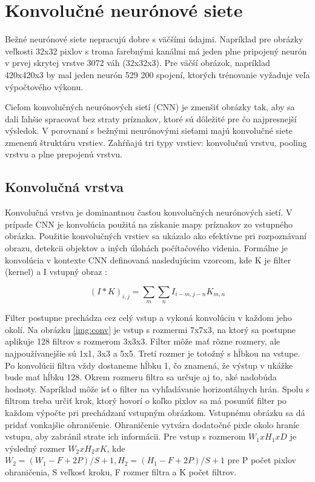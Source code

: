 \section{Konvolučné neurónové siete}

Bežné neurónové siete nepracujú dobre s väčšími údajmi. Napríklad pre obrázky veľkosti 32x32 pixlov s troma farebnými kanálmi má jeden plne pripojený neurón v prvej skrytej vrstve 3072 váh (32x32x3). Pre väčší obrázok, napríklad 420x420x3 by mal jeden neurón 529 200 spojení, ktorých trénovanie vyžaduje veľa výpočtového výkonu.

Cieľom konvolučných neurónových sietí (CNN) je zmenšiť obrázky tak, aby sa dali ľahšie spracovať bez straty príznakov, ktoré sú dôležité pre čo najpresnejší výsledok. V porovnaní s bežnými neurónovými sieťami majú konvolučné siete zmenenú štruktúru vrstiev. Zahŕňajú tri typy vrstiev: konvolučnú vrstvu, pooling vrstvu a plne prepojenú vrstvu.

\subsection{Konvolučná vrstva}

Konvolučná vrstva je dominantnou časťou konvolučných neurónových sietí. V prípade CNN je konvolúcia použitá na získanie mapy príznakov zo vstupného obrázka. Použitie konvolučných vrstiev sa ukázalo ako efektívne pri rozpoznávaní obrazu, detekcii objektov a iných úlohách počítačového videnia. Formálne je konvolúcia v kontexte CNN definovaná nasledujúcim vzorcom, kde K je filter (kernel) a I vstupný obraz \cite{cnn-intro}:

\begingroup
\large
\begin{equation}
(I*K)_{i,j} = \sum_{m} \sum_{n} I_{i-m, j-n} K_{m,n}
\end{equation}
\endgroup

Filter postupne prechádza cez celý vstup a vykoná konvolúciu v každom jeho okolí. Na obrázku \ref{img:conv} je vstup s rozmermi 7x7x3, na ktorý sa postupne aplikuje 128 filtrov s rozmerom 3x3x3. Filter môže mať rôzne rozmery, ale najpoužívanejšie sú 1x1, 3x3 a 5x5. Tretí rozmer je totožný s hĺbkou na vstupe. Po konvolúcii filtra vždy dostaneme hĺbku 1, čo znamená, že výstup v ukážke bude mať hĺbku 128. Okrem rozmeru filtra sa určuje aj to, aké nadobúda hodnoty. Napríklad môže isť o filter na vyhľadávanie horizontálnych hrán. Spolu s filtrom treba určiť krok, ktorý hovorí o koľko pixlov sa má posunúť filter po každom výpočte pri prechádzaní vstupným obrázkom. Vstupnému obrázku sa dá pridať vonkajšie ohraničenie. Ohraničenie vytvára dodatočné pixle okolo hraníc vstupu, aby zabránil strate ich informácii. Pre vstup s rozmerom \begin{math}W_1xH_1xD\end{math} je výsledný rozmer \begin{math}W_2xH_2xK\end{math}, kde \begin{math}W_2 = (W_1 - F + 2P)/S + 1, H_2 = (H_1 - F + 2P)/S + 1\end{math} pre P počet pixlov ohraničenia, S veľkosť kroku, F rozmer filtra a K počet filtrov.

